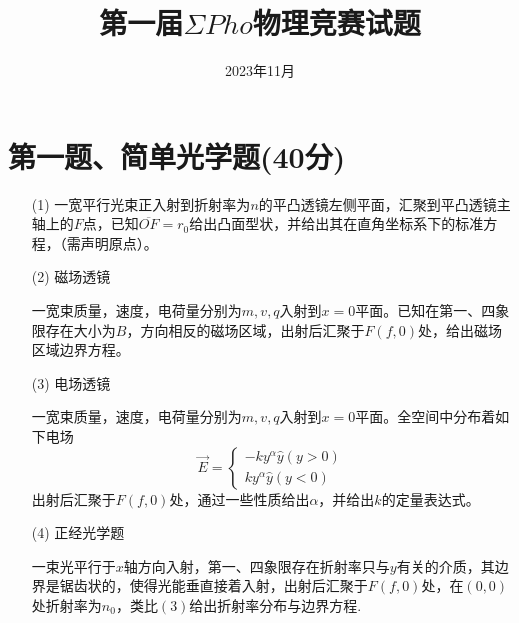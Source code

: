 \documentclass{article}
\title{\textbf{第一届$\Sigma Pho$物理竞赛试题}}
\date{2023年11月}
\begin{document}
\maketitle
\newcommand \dbar {{\; \bar{} \hspace{-0.3em} \mathrm d}}
\section*{第一题、简单光学题(40分)}
\begin{itemize}
\item[(1)]一宽平行光束正入射到折射率为$n$的平凸透镜左侧平面，汇聚到平凸透镜主轴上的$F$点，已知$\overline{OF}=r_0$给出凸面型状，并给出其在直角坐标系下的标准方程，（需声明原点）。
\item[(2)]磁场透镜\par
一宽束质量，速度，电荷量分别为$m,v,q$入射到$x=0$平面。已知在第一、四象限存在大小为$B$，方向相反的磁场区域，出射后汇聚于$F(f,0)$处，给出磁场区域边界方程。
\item[(3)]电场透镜\par
一宽束质量，速度，电荷量分别为$m,v,q$入射到$x=0$平面。全空间中分布着如下电场
\[
\vec{E}=
\begin{cases}
-ky^{\alpha}\hat{y}(y>0)\\
ky^{\alpha}\hat{y}(y<0)
\end{cases}
\]
出射后汇聚于$F(f,0)$处，通过一些性质给出$\alpha$，并给出$k$的定量表达式。
\item[(4)]正经光学题\par
一束光平行于$x$轴方向入射，第一、四象限存在折射率只与$y$有关的介质，其边界是锯齿状的，使得光能垂直接着入射，出射后汇聚于$F(f,0)$处，在$(0,0)$处折射率为$n_0$，类比$(3)$给出折射率分布与边界方程.
\end{itemize}
\end{document}
